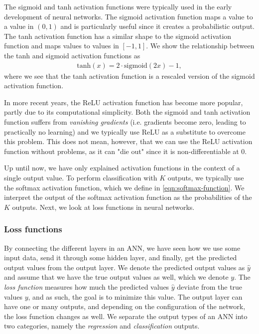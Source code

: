 The sigmoid and tanh activation functions were typically used in the early development of neural networks. The sigmoid activation function maps a value to a value in $(0, 1)$ and is particularly useful since it creates a probabilistic output. The tanh activation function has a similar shape to the sigmoid activation function and maps values to values in $[-1, 1]$. We show the relationship between the tanh and sigmoid activation functions as
\begin{align}
    \label{eqn:tanh-sigmoid-relation}
    \text{tanh}(x) = 2 \cdot \text{sigmoid}(2x) - 1,
\end{align}
where we see that the tanh activation function is a rescaled version of the sigmoid activation function.

In more recent years, the ReLU activation function has become more popular, partly due to its computational simplicity. Both the sigmoid and tanh activation function suffers from \textit{vanishing gradients} (i.e. gradients become zero, leading to practically no learning) and we typically use ReLU as a substitute to overcome this problem. This does not mean, however, that we can use the ReLU activation function without problems, as it can "die out" since it is non-differentiable at 0.

Up until now, we have only explained activation functions in the context of a single output value. To perform classification with $K$ outputs, we typically use the softmax activation function, which we define in \cref{eqn:softmax-function}. We interpret the output of the softmax activation function as the probabilities of the $K$ outputs. Next, we look at loss functions in neural networks.

\subsubsection{Loss functions}
\label{sec:ann-loss-functions}
By connecting the different layers in an ANN, we have seen how we use some input data, send it through some hidden layer, and finally, get the predicted output values from the output layer. We denote the predicted output values as $\hat{y}$ and assume that we have the true output values as well, which we denote $y$. The \textit{loss function} measures how much the predicted values $\hat{y}$ deviate from the true values $y$, and as such, the goal is to minimize this value. The output layer can have one or many outputs, and depending on the configuration of the network, the loss function changes as well. We separate the output types of an ANN into two categories, namely the \textit{regression} and \textit{classification} outputs.

